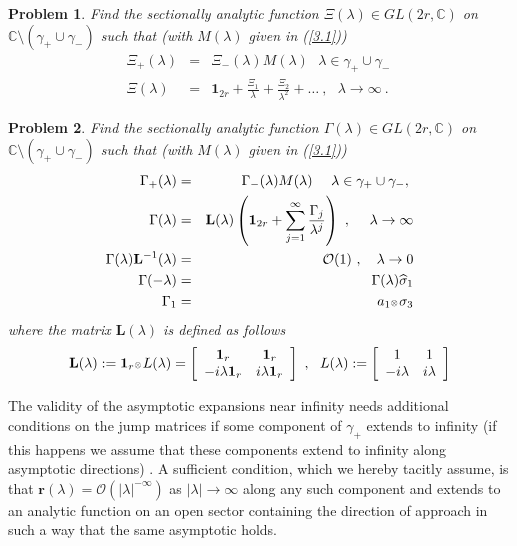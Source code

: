 \documentclass{article}
\newtheorem{problem}{Problem}[section]
\def\L{{\mathbf L}}
\def\ot{\hbox{\resizebox{6pt}{!}{$ \otimes \,
$}}}
\def\r{ {\mathbf r}}
\def \C{{\mathbf C}}
\def\s{\sigma}
\def\C{{\mathbb C}}
\def\1{\mathbf 1}
\def\wh{\widehat}
\newcommand{\be}{\begin{eqnarray}}
\newcommand{\ee}{\end{eqnarray}}
\def\le{\left}
\def\ri{\right}
\begin{document}
\begin{shaded}
\begin{problem}
\label{prob3}
Find  the sectionally analytic function $\Xi(\lambda)\in GL(2r, \C)$ on $\C\setminus (\gamma_+\cup \gamma_-)$ such that  (with $M(\lambda)$  given in (\ref{3.1}))
\be
\Xi_+(\lambda) &=& \Xi_-(\lambda) M(\lambda)\ \ \ \lambda \in \gamma_+\cup \gamma_-\ \\
\Xi(\lambda) &=& \1_{2r} + \frac {\Xi_1}\lambda + \frac {\Xi_2} {\lambda^2} + \dots  \ ,\ \ \ \lambda\to \infty\ . \label{34}
\ee
\end{problem}
\end{shaded}

\begin{shaded}
\begin{problem}
\label{prob1}
Find  the sectionally analytic function $\Gamma(\lambda)\in GL(2r,\C)$ on $\C\setminus (\gamma_+\cup \gamma_-)$ such that  (with $M(\lambda)$  given in (\ref{3.1}))
\be
\Gamma_+(\lambda) &=& \Gamma_-(\lambda) M(\lambda)\ \ \ \ \lambda \in \gamma_+\cup \gamma_-,\
\label{Gammajumps} \\
\Gamma(\lambda) &=& 
\L (\lambda) \le(\1_{2r} + \sum_{j=1}^{\infty} \frac {\Gamma_j}{\lambda^j}\ri) \ ,\ \ \ \ \lambda\to \infty
\label{expGamma}
\\
\Gamma(\lambda) \L^{-1}(\lambda) &=& \mathcal O(1) \ ,\ \ \ \lambda \to 0
\label{0asy}\\ 
\Gamma(-\lambda) &=& \Gamma(\lambda)\wh \s_1
\label{symmetry2}\\
\Gamma_1 &=& a_1  \ot  \s_3\label{gaugefixing}
\ee 
where the matrix $\L(\lambda)$ is defined as follows
\be
\L(\lambda) := \1_r \ot  L(\lambda) = \le[
\begin{array}{cc}
\1_r & \1_r \\
-i\lambda\1_r & i\lambda\1_r
\end{array}
\ri]\ ,\ \ L(\lambda) := \le[
\begin{array}{cc}
1 & 1 \\
-i\lambda & i\lambda
\end{array}
\ri] \label{elldef}
\ee
\end{problem}
\end{shaded}
The validity of the asymptotic expansions near infinity needs additional conditions on the jump matrices if some component of $\gamma_+$ extends to infinity (if this happens we assume that these components extend to infinity along asymptotic directions) . A sufficient condition, which we hereby tacitly assume, is that $\r(\lambda) = \mathcal O(|\lambda|^{-\infty})$ as $|\lambda|\to\infty$ along any such component and extends to an analytic function on an open sector containing the direction of approach in such a way that the same asymptotic holds. 
\end{document}
